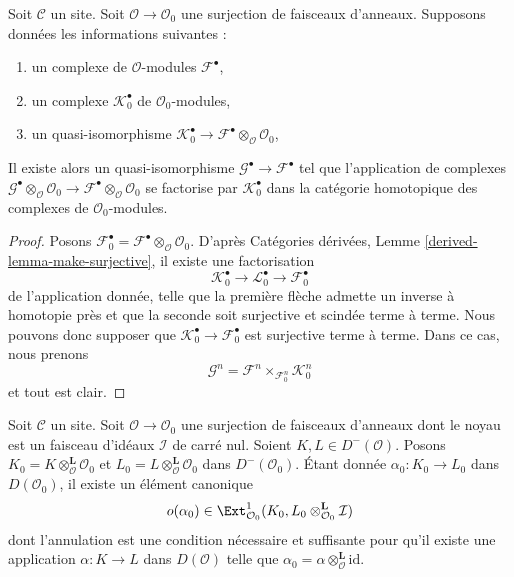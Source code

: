 \begin{lemma}
\label{lemma-lift-map-complexes}
Soit $\mathcal{C}$ un site. Soit $\mathcal{O} \to \mathcal{O}_0$ une
surjection de faisceaux d'anneaux. Supposons données les informations
suivantes :
\begin{enumerate}
\item un complexe de $\mathcal{O}$-modules $\mathcal{F}^\bullet$,
\item un complexe $\mathcal{K}_0^\bullet$ de $\mathcal{O}_0$-modules,
\item un quasi-isomorphisme $\mathcal{K}_0^\bullet \to
\mathcal{F}^\bullet \otimes_\mathcal{O} \mathcal{O}_0$,
\end{enumerate}
Il existe alors un quasi-isomorphisme
$\mathcal{G}^\bullet \to \mathcal{F}^\bullet$ tel que l'application de
complexes
$\mathcal{G}^\bullet  \otimes_\mathcal{O} \mathcal{O}_0 \to
\mathcal{F}^\bullet \otimes_\mathcal{O} \mathcal{O}_0$ se factorise par
$\mathcal{K}_0^\bullet$ dans la catégorie homotopique des complexes de
$\mathcal{O}_0$-modules.
\end{lemma}

\begin{proof}
Posons $\mathcal{F}_0^\bullet =
\mathcal{F}^\bullet \otimes_\mathcal{O} \mathcal{O}_0$.
D'après Catégories dérivées, Lemme \ref{derived-lemma-make-surjective}, il
existe une factorisation
$$
\mathcal{K}_0^\bullet \to \mathcal{L}_0^\bullet \to \mathcal{F}_0^\bullet
$$
de l'application donnée, telle que la première flèche admette un inverse à
homotopie près et que la seconde soit surjective et scindée terme à terme.
Nous pouvons donc supposer que
$\mathcal{K}_0^\bullet \to \mathcal{F}_0^\bullet$ est surjective terme à
terme. Dans ce cas, nous prenons
$$
\mathcal{G}^n = \mathcal{F}^n \times_{\mathcal{F}^n_0} \mathcal{K}_0^n
$$
et tout est clair.
\end{proof}

\begin{lemma}
\label{lemma-inf-obs-map-defo-complex}
Soit $\mathcal{C}$ un site. Soit $\mathcal{O} \to \mathcal{O}_0$ une
surjection de faisceaux d'anneaux dont le noyau est un faisceau d'idéaux
$\mathcal{I}$ de carré nul. Soient $K, L \in D^-(\mathcal{O})$.
Posons $K_0 = K \otimes_\mathcal{O}^\mathbf{L} \mathcal{O}_0$ et
$L_0 = L \otimes_\mathcal{O}^\mathbf{L} \mathcal{O}_0$ dans
$D^-(\mathcal{O}_0)$. Étant donnée
$\alpha_0 : K_0 \to L_0$ dans $D(\mathcal{O}_0)$, il existe un élément
canonique
$$
o(\alpha_0) \in \Ext^1_{\mathcal{O}_0}(K_0,
L_0 \otimes_{\mathcal{O}_0}^\mathbf{L} \mathcal{I})
$$
dont l'annulation est une condition nécessaire et suffisante pour qu'il existe
une application $\alpha : K \to L$ dans $D(\mathcal{O})$ telle que
$\alpha_0 = \alpha \otimes_\mathcal{O}^\mathbf{L} \text{id}$.
\end{lemma}

